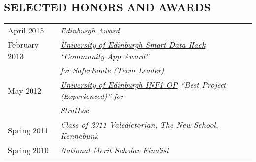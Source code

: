 \documentclass[line, margin]{res}
\begin{document}
\begin{resume}
\section{SELECTED HONORS AND AWARDS}
\begin{tabular}{@{}l l}
April 2015 & \textit{Edinburgh Award} \linebreak \\[5pt]
February 2013 & \textit{\href{https://web.archive.org/web/20130719001143/http://data.inf.ed.ac.uk/ilwhack/finalprojects.php}{University of Edinburgh Smart Data Hack} ``Community App Award''}\linebreak\\[1pt] 
&\textit{for \href{https://github.com/team-tusive/ilwhack}{SaferRoute} (Team Leader)} \linebreak \\[5pt]
May 2012 & \textit{\href{https://sites.google.com/site/2012oop/winners}{University of Edinburgh INF1-OP} ``Best Project (Experienced)'' for} \linebreak \\[1pt] 
 &\textit{\href{http://www.chasestevens.com/team2civ/}{StratLoc}} \linebreak \\[5pt]
Spring 2011 & \textit{Class of 2011 Valedictorian, The New School, Kennebunk} \\[5pt]
Spring 2010 & \textit{National Merit Scholar Finalist} \\[5pt]
\end{tabular}
\end{resume}
\end{document}
